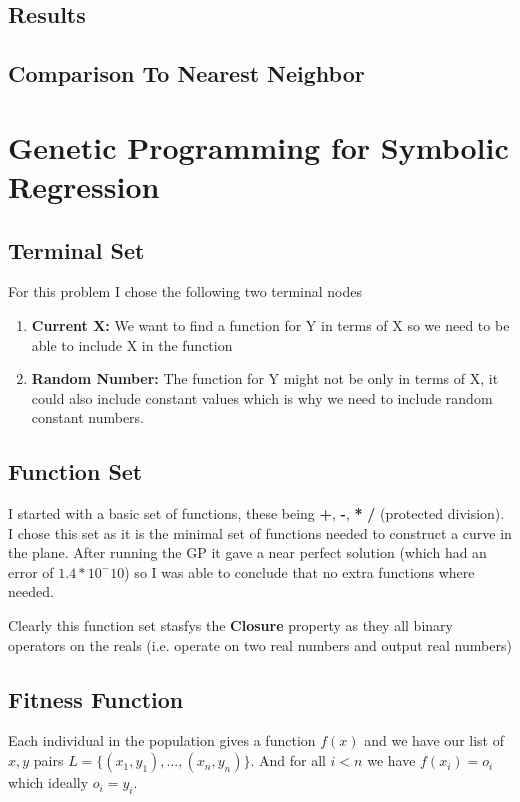 \documentclass[a4paper, 12pt]{article}
\begin{document}
		\subsection{Results}
		
		\subsection{Comparison To Nearest Neighbor}
  	
  	\section{Genetic Programming for Symbolic Regression}
  	
  		\subsection{Terminal Set}
  			For this problem I chose the following two terminal nodes
  			
  			\begin{enumerate}
  				\item \textbf{Current X:} We want to find a function for Y in terms of X so we need to be able to include X in the function
  				
  				\item \textbf{Random Number:} The function for Y might not be only in terms of X, it could also include constant values which is why we need to include random constant numbers.
  			\end{enumerate}

		\subsection{Function Set}
			I started with a basic set of functions, these being \textbf{+}, \textbf{-}, \textbf{*} \textbf{/} (protected division). I chose this set as it is the minimal set of functions needed to construct a curve in the plane. After running the GP it gave a near perfect solution (which had an error of $1.4*10^-10$) so I was able to conclude that no extra functions where needed.
			
			Clearly this function set stasfys the \textbf{Closure} property as they all binary operators on the reals (i.e. operate on two real numbers and output real numbers)

		\subsection{Fitness Function}
			Each individual in the population gives a function $f(x)$ and we have our list of $x, y$ pairs $L = \{(x_1, y_1), ...,(x_n, y_n) \}$. And for all $i < n$ we have $f(x_i) = o_i$ which ideally $o_i = y_i$.\\
			
\end{document}
